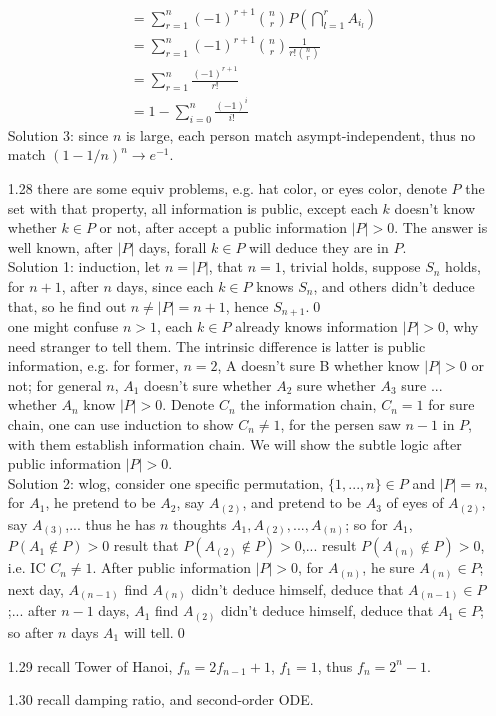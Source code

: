 \documentclass[paper=a4, fontsize=11pt]{scrartcl} %
\numberwithin{equation}{section} %
\numberwithin{figure}{section} %
\numberwithin{table}{section} %
\begin{document}
\begin{itemize}
\begin{align}
			&= \sum_{r=1}^n (-1)^{r+1} {n \choose r}  P(\bigcap_{l=1}^r A_{i_l})\\
			&= \sum_{r=1}^n (-1)^{r+1} {n \choose r} \frac{1}{r! {n\choose r}}\\
			&= \sum_{r=1}^n \frac{(-1)^{r+1}}{r!}\\
			&= 1 - \sum_{i=0}^n \frac{(-1)^i}{i!}
	\end{align}
	Solution 3: since $n$ is large, each person match asympt-independent, thus no match $(1-1/n)^n\rightarrow e^{-1}$.
	\item[1.28] there are some equiv problems, e.g. hat color, or eyes color, denote $P$ the set with that property, all information is public, except each $k$ doesn't know whether $k\in P$ or not, after accept a public information $|P|>0$. The answer is well known, after $|P|$ days, forall $k\in P$ will deduce they are in $P$.\\
	Solution 1: induction, let $n=|P|$, that $n=1$, trivial holds, suppose $S_n$ holds, for $n+1$, after $n$ days, since each $k\in P$ knows $S_n$, and others didn't deduce that, so he find out $n\neq |P|=n+1$, hence $S_{n+1}$.\qed \\
	one might confuse $n>1$, each $k\in P$ already knows information $|P|>0$, why need stranger to tell them. The intrinsic difference is latter is public information, e.g. for former, $n=2$, A doesn't sure B whether know $|P|>0$ or not; for general $n$, $A_1$ doesn't sure whether $A_2$ sure whether $A_3$ sure ... whether $A_n$ know $|P|>0$. Denote $C_n$ the information chain, $C_n=1$ for sure chain, one can use induction to show $C_n\neq 1$, for the persen saw $n-1$ in $P$, with them establish information chain. We will show the subtle logic after public information $|P|>0$.\\
	Solution 2: wlog, consider one specific permutation, $\{1,...,n\}\in P$ and $|P|=n$, for $A_1$, he pretend to be $A_2$, say $A_{(2)}$, and pretend to be $A_3$ of eyes of $A_{(2)}$, say $A_{(3)}$,... thus he has $n$ thoughts $A_1,A_{(2)},...,A_{(n)}$; so for $A_1$, $P(A_1\notin P)>0$ result that $P(A_{(2)}\notin P)>0$,... result $P(A_{(n)}\notin P)>0$, i.e. IC $C_n\neq 1$. After public information $|P|>0$, for $A_{(n)}$, he sure $A_{(n)}\in P$; next day, $A_{(n-1)}$ find $A_{(n)}$ didn't deduce himself, deduce that $A_{(n-1)}\in P$;... after $n-1$ days, $A_1$ find $A_{(2)}$ didn't deduce himself, deduce that $A_1\in P$; so after $n$ days $A_1$ will tell.\qed
	\item[1.29] recall Tower of Hanoi, $f_n = 2f_{n-1} +1$, $f_1=1$, thus $f_n=2^n-1$.
	\item[1.30] recall damping ratio, and second-order ODE.
\end{itemize}
\end{document}
